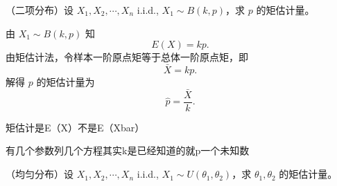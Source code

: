 \begin{homework}[2]
（二项分布）设 \(X_1,X_2,\cdots,X_n\) i.i.d., \(X_1\sim B(k,p)\)，求 \(p\) 的矩估计量。
\end{homework}
\begin{solution}
由 \(X_1\sim B(k,p)\) 知
\[
E(X)=kp.
\]
由矩估计法，令样本一阶原点矩等于总体一阶原点矩，即
\[
\bar X=kp.
\]
解得 \(p\) 的矩估计量为
\[
\hat p=\frac{\bar X}{k}.
\]
\end{solution}
\begin{dxtips}
    矩估计是E（X）不是E（Xbar）
\end{dxtips}
\begin{dxtips}
    有几个参数列几个方程其实k是已经知道的就p一个未知数
\end{dxtips}
\begin{homework}[3]
（均匀分布）设 \(X_1,X_2,\cdots,X_n\) i.i.d., \(X_1\sim U(\theta_1,\theta_2)\)，求 \(\theta_1,\theta_2\) 的矩估计量。
\end{homework}

